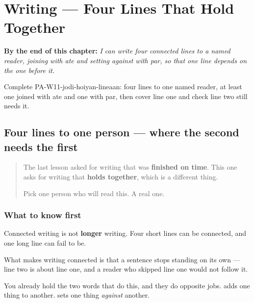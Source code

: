 
\chapter{Writing --- Four Lines That Hold Together}
\label{ch:pa-jodi-hoiyan-lineaan}

\begin{chapteropening}
\textbf{By the end of this chapter:} \emph{I can write four connected lines to a named reader, joining with ate and setting against with par, so that one line depends on the one before it.}

Complete PA-W11-jodi-hoiyan-lineaan: four lines to one named reader, at least one joined with ate and one with par, then cover line one and check line two still needs it.
\end{chapteropening}

\section[\texorpdfstring{\pa{ਅਤੇ} (ate)}{ਅਤੇ (ate)}]{Four lines to one person — where the second needs the first}

\label{lesson:PA-W11-jodi-hoiyan-lineaan}



\begin{quote}
The last lesson asked for writing that was \textbf{finished on time}. This one asks for writing that \textbf{holds together}, which is a different thing.

Pick one person who will read this. A real one.
\end{quote}

\subsection*{What to know first}
Connected writing is not \textbf{longer} writing. Four short lines can be connected, and one long line can fail to be.

What makes writing connected is that a sentence stops standing on its own — line two is about line one, and a reader who skipped line one would not follow it.

You already hold the two words that do this, and they do opposite jobs. \textbf{} adds one thing to another. \textbf{} sets one thing \emph{against} another.

